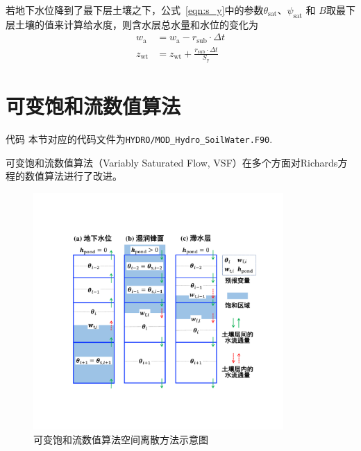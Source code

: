 若地下水位降到了最下层土壤之下，公式~\eqref{eqn:s_y}中的参数$\theta_{\mathrm {sat}} $、$\psi_{\mathrm {sat}} $ 和 $B$取最下层土壤的值来计算给水度，则含水层总水量和水位的变化为
\begin{equation}
  \begin{aligned}
    w_{\mathrm{a}} & = w_{\mathrm{a}} - r_{\mathrm{sub}} \cdot \Delta t \\
    z_{\mathrm{wt}} & = z_{\mathrm{w t}}+\frac{r_{\mathrm{sub}} \cdot \Delta t}{S_{\mathrm{y}}}
  \end{aligned}
\end{equation}

\section{可变饱和流数值算法}

\begin{mymdframed}{代码}
  本节对应的代码文件为\texttt{HYDRO/MOD\_Hydro\_SoilWater.F90}.
\end{mymdframed}

可变饱和流数值算法（Variably Saturated Flow, VSF）\citep{dai2019vsf}在多个方面对Richards方程的数值算法进行了改进。

{
  \begin{figure}[htbp]
    \centering
    \includegraphics[width=0.85\textwidth]{Figures/陆地表面的水分循环/可变饱和流数值算法预报区域空间结构示意图.pdf}
    \caption{可变饱和流数值算法空间离散方法示意图}
    \label{fig:可变饱和流数值算法预报区域空间结构示意图}
  \end{figure}
}

